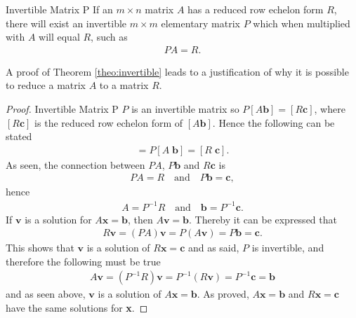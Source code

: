 \begin{theorem}{Invertible Matrix P} \label{the:PMatrix}
    If an $m \times n$ matrix $A$ has a reduced row echelon form $R$, there will exist an invertible $m \times m$ elementary matrix $P$ which when multiplied with $A$ will equal $R$, such as
    \begin{align*}
        PA=R.
    \end{align*}
    \cite[127]{LiAl}
    \label{theo:invertible}
\end{theorem}
A proof of Theorem \ref{theo:invertible} leads to a justification of why it is possible to reduce a matrix $A$ to a matrix $R$.
\begin{proof}{Invertible Matrix P}
    $P$ is an invertible matrix so $P[A\mathbf{b}]=[R\mathbf{c}]$, where $[R\mathbf{c}]$ is the reduced row echelon form of $[A\mathbf{b}]$. 
    Hence the following can be stated
    \begin{align*}
        [PA\;P\mathbf{b}]=P[A\;\mathbf{b}]=[R\;\mathbf{c}].
    \end{align*}
    As seen, the connection between $PA$, $P\mathbf{b}$ and $R\mathbf{c}$ is
    \begin{align*}
        PA=R \quad\text{and}\quad P\mathbf{b}=\mathbf{c},
    \end{align*}
    hence
    \begin{align*}
        A = P^{-1}R \quad \text{and} \quad \mathbf{b} = P^{-1}\mathbf{c}.
    \end{align*}
    If $\mathbf{v}$ is a solution for $A\mathbf{x}=\mathbf{b}$, then $A\mathbf{v}=\mathbf{b}$. Thereby it can be expressed that 
    \begin{align*}
        R\mathbf{v}=(PA)\mathbf{v}=P(A\mathbf{v})=P\mathbf{b}=\mathbf{c}.
    \end{align*}
    This shows that $\mathbf{v}$ is a solution of $R\mathbf{x}=\mathbf{c}$
    and as said, $P$ is invertible, and therefore the following must be true
    \begin{align*}
        A\mathbf{v}=(P^{-1}R)\mathbf{v}=P^{-1}(R\mathbf{v})=P^{-1}\mathbf{c}=\mathbf{b}
    \end{align*}
    and as seen above, $\mathbf{v}$ is a solution of $A\mathbf{x}=\mathbf{b}$. As proved, $A\mathbf{x}=\mathbf{b}$ and $R\mathbf{x}=\mathbf{c}$ have the same solutions for \textbf{x}. \qedsymbol
\end{proof}